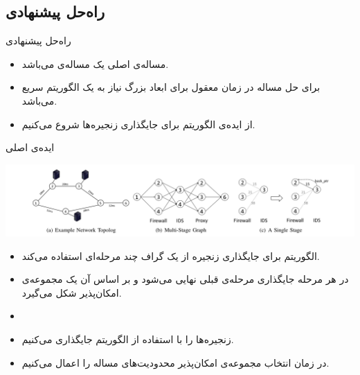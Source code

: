 \documentclass{beamer}
\makeatletter
\newcommand{\RTList}{\raggedleft\rightskip\@totalleftmargin}
\makeatother
\begin{document}
\begin{persian}
\begin{frame}{}
    \section{راه‌حل پیشنهادی}
\end{frame}
\begin{frame}{راه‌حل پیشنهادی}
    \begin{itemize}\RTList{}
        \item مساله‌ی اصلی یک مساله‌ی  می‌باشد.
        \item برای حل مساله در زمان معقول برای ابعاد بزرگ نیاز به یک الگوریتم سریع می‌باشد.
        \item از ایده‌ی الگوریتم  برای جایگذاری زنجیره‌ها شروع می‌کنیم.
    \end{itemize}
\end{frame}
\begin{frame}{ایده‌ی اصلی}
    \begin{center}
        \includegraphics[scale=0.3]{images/bari.png}
    \end{center}
    \begin{itemize}\RTList{}
        \item الگوریتم برای جایگذاری زنجیره از یک گراف چند مرحله‌ای استفاده می‌کند.
        \item در هر مرحله جایگذاری مرحله‌ی قبلی نهایی می‌شود و بر اساس آن یک مجموعه‌ی امکان‌پذیر شکل می‌گیرد.
    \end{itemize}
\end{frame}
\begin{frame}{}
    \begin{itemize}\RTList{}
        \justifying
        \item {}
        \item زنجیره‌ها را با استفاده از الگوریتم  جایگذاری می‌کنیم.
        \item در زمان انتخاب مجموعه‌ی امکان‌پذیر محدودیت‌های مساله را اعمال می‌کنیم.

\end{itemize}
\end{frame}
\end{persian}
\end{document}
